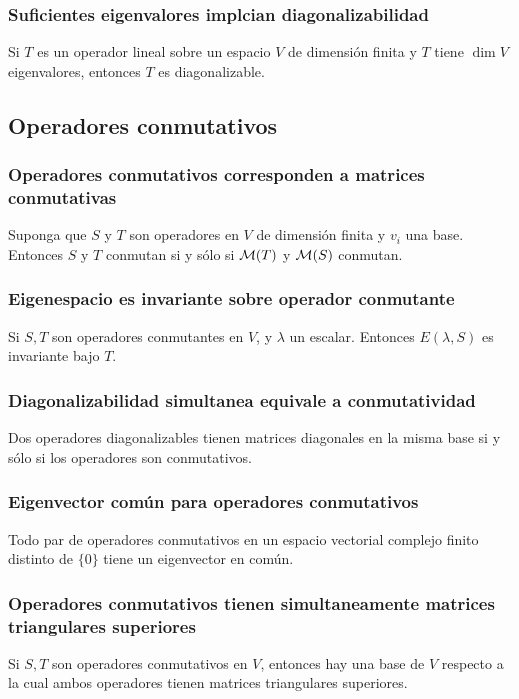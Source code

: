 \documentclass{article}
\begin{document}
\subsubsection{Suficientes eigenvalores implcian diagonalizabilidad}
Si $T$ es un operador lineal sobre un espacio $V$ de dimensión
finita y $T$ tiene $\dim V$ eigenvalores, entonces
$T$ es diagonalizable.

\subsection{Operadores conmutativos}
\subsubsection{Operadores conmutativos corresponden a matrices conmutativas}
Suponga que $S$ y $T$ son operadores en $V$ de dimensión finita
y $v_i$ una base. Entonces $S$ y $T$ conmutan si y sólo si
$\mathcal{M}(T)$ y $\mathcal{M}(S)$ conmutan.

\subsubsection{Eigenespacio es invariante sobre operador
conmutante}
Si $S,T$ son operadores conmutantes en $V$, y $\lambda$ un
escalar. Entonces $E(\lambda, S)$ es invariante bajo $T$.

\subsubsection{Diagonalizabilidad simultanea equivale a conmutatividad}
Dos operadores diagonalizables tienen matrices diagonales
en la misma base si y sólo si los operadores son conmutativos.

\subsubsection{Eigenvector común para operadores conmutativos}
Todo par de operadores conmutativos en un espacio vectorial
complejo finito distinto de $\{0\}$ tiene un
eigenvector en común.

\subsubsection{Operadores conmutativos tienen simultaneamente
matrices triangulares superiores}
Si $S,T$ son operadores conmutativos en $V$, entonces
hay una base de $V$ respecto a la cual ambos operadores
tienen matrices triangulares superiores.
\end{document}
